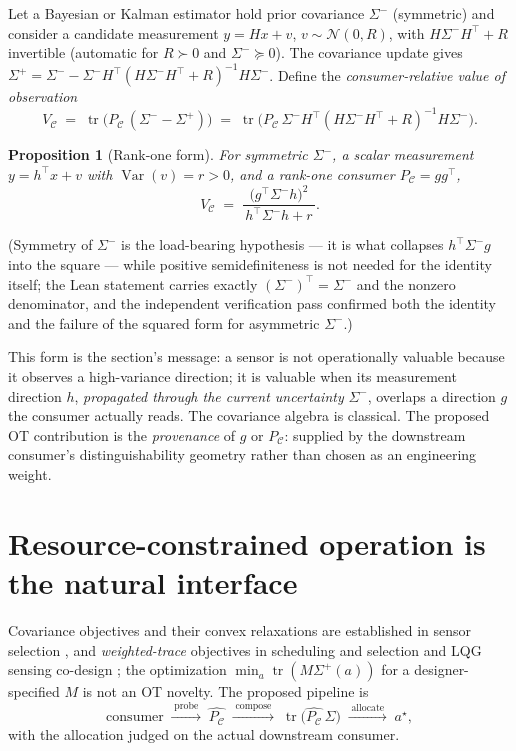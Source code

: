 \documentclass{article}
\newtheorem{proposition}{Proposition}
\theoremstyle{definition}
\theoremstyle{remark}
\newcommand{\PC}{P_{\mathcal{C}}}
\newcommand{\tr}{\operatorname{tr}}
\newcommand{\Sig}{\Sigma}
\newcommand{\Sm}{\Sigma^{-}}
\newcommand{\Sp}{\Sigma^{+}}
\newcommand{\VC}{V_{\mathcal{C}}}
\begin{document}
Let a Bayesian or Kalman estimator hold prior covariance $\Sm$ (symmetric)
and consider a candidate measurement $y=Hx+v$, $v\sim\mathcal N(0,R)$, with
$H\Sm H^{\top}+R$ invertible (automatic for $R\succ 0$ and $\Sm\succeq 0$).
The covariance update gives
$\Sp=\Sm-\Sm H^{\top}(H\Sm H^{\top}+R)^{-1}H\Sm$. Define the
\emph{consumer-relative value of observation}
\begin{equation}
\label{eq:voi}
\VC \;=\; \tr\!\big(\PC\,(\Sm-\Sp)\big)
\;=\; \tr\!\big(\PC\,\Sm H^{\top}(H\Sm H^{\top}+R)^{-1}H\Sm\big).
\end{equation}

\begin{proposition}[Rank-one form]
\label{prop:voi}
For symmetric $\Sm$, a scalar measurement $y=h^{\top}x+v$ with
$\operatorname{Var}(v)=r>0$, and a rank-one consumer $\PC=gg^{\top}$,
\begin{equation}
\label{eq:voirankone}
\VC \;=\; \frac{\big(g^{\top}\Sm h\big)^{2}}{\,h^{\top}\Sm h+r\,}.
\end{equation}
\end{proposition}

(Symmetry of $\Sm$ is the load-bearing hypothesis --- it is what collapses
$h^{\top}\Sm g$ into the square --- while positive semidefiniteness is not
needed for the identity itself; the Lean statement carries exactly
$(\Sm)^{\top}=\Sm$ and the nonzero denominator, and the independent
verification pass confirmed both the identity and the failure of the
squared form for asymmetric $\Sm$.)

This form is the section's message: a sensor is not operationally valuable
because it observes a high-variance direction; it is valuable when its
measurement direction $h$, \emph{propagated through the current uncertainty}
$\Sm$, overlaps a direction $g$ the consumer actually reads. The covariance
algebra is classical. The proposed OT contribution is the \emph{provenance}
of $g$ or $\PC$: supplied by the downstream consumer's distinguishability
geometry rather than chosen as an engineering weight.

\section{Resource-constrained operation is the natural interface}
\label{sec:resources}

Covariance objectives and their convex relaxations are established in
sensor selection \citep{joshiboyd2009}, and \emph{weighted-trace}
objectives in scheduling and selection \citep{unified2023} and LQG sensing
co-design \citep{tzoumas2021}; the optimization $\min_a \tr(M\Sp(a))$ for a
designer-specified $M$ is not an OT novelty. The proposed pipeline is
\begin{equation*}
\text{consumer} \;\xrightarrow{\;\text{probe}\;}\; \widehat{\PC}
\;\xrightarrow{\;\text{compose}\;}\; \tr\big(\widehat{\PC}\,\Sig\big)
\;\xrightarrow{\;\text{allocate}\;}\; a^{\star},
\end{equation*}
with the allocation judged on the actual downstream consumer.
\end{document}
